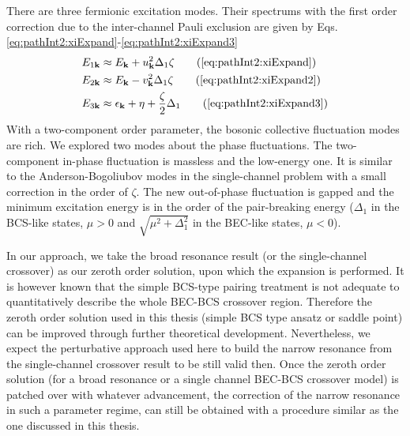 There are three fermionic excitation modes. Their spectrums with the first order correction due to the inter-channel Pauli exclusion are given by Eqs. \ref{eq:pathInt2:xiExpand}-\ref{eq:pathInt2:xiExpand3}
\begin{align}
E_{1\vk}&\approx{}E_{\vk}+u_{\vk}^{2}\Delta_{1}\zeta\tag{\ref{eq:pathInt2:xiExpand}}\\
E_{2\vk}&\approx{}E_{\vk}-v_{\vk}^{2}\Delta_{1}\zeta\tag{\ref{eq:pathInt2:xiExpand2}}\\
E_{3\vk}&\approx{}\epsilon_{\vk}+\eta+\frac{\zeta}{2}\Delta_{1}
\tag{\ref{eq:pathInt2:xiExpand3}}
\end{align}
With a two-component order parameter, the bosonic collective fluctuation modes are rich.  We explored two  modes about the phase fluctuations.  The two-component in-phase fluctuation is massless and the low-energy one.  It is similar to the Anderson-Bogoliubov modes in the single-channel problem with a small correction in the order of $\zeta$.  The new out-of-phase fluctuation is gapped and the minimum excitation energy is in the order of the pair-breaking energy ($\Delta_{1}$ in the BCS-like states, $\mu>0$ and $\sqrt{\mu^{2}+\Delta_{1}^{2}}$ in the BEC-like states, $\mu<0$).  

       In our approach, we take the broad resonance result (or the single-channel crossover) as our zeroth order solution, upon which the expansion is performed.  It is however known that the simple BCS-type pairing treatment is not adequate  to quantitatively describe the whole BEC-BCS crossover region.  Therefore the zeroth order solution used in this thesis (simple BCS type ansatz or saddle point) can be improved through further theoretical development.  Nevertheless, we expect the perturbative approach used here to build the narrow resonance from the single-channel crossover result to be still valid then.  Once the zeroth order solution (for a broad resonance or a single channel BEC-BCS crossover model) is patched over with whatever advancement, the correction of the narrow resonance in such a parameter regime, can still be obtained with a procedure similar as the one discussed in this thesis.  
       
